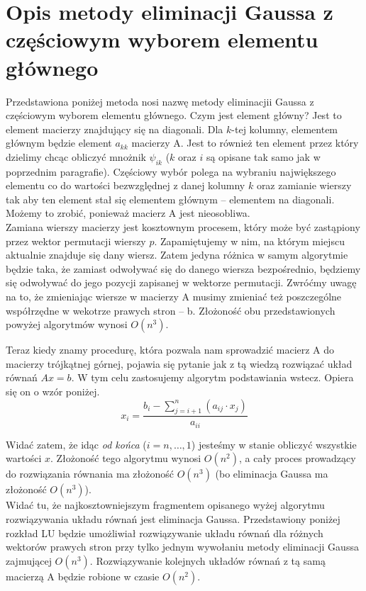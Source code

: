 \documentclass[]{article}
\begin{document}
	\section*{Opis metody eliminacji Gaussa z częściowym wyborem elementu głównego}
	Przedstawiona poniżej metoda nosi nazwę metody eliminacjii Gaussa z częściowym wyborem elementu głównego.
	Czym jest element główny? Jest to element macierzy znajdujący się na diagonali. Dla $k$-tej kolumny, elementem głównym będzie element $a_{kk}$ macierzy A. Jest to również ten element przez który dzielimy chcąc obliczyć mnożnik $\psi_{ik}$ ($k$ oraz $i$ są opisane tak samo jak w poprzednim paragrafie). Częściowy wybór polega na wybraniu największego elementu co do wartości bezwzględnej z danej kolumny $k$ oraz zamianie wierszy tak aby ten element stał się elementem głównym -- elementem na diagonali. Możemy to zrobić, ponieważ macierz A jest nieosobliwa. \\
	Zamiana wierszy macierzy jest kosztownym procesem, który może być zastąpiony przez wektor permutacji wierszy $p$. Zapamiętujemy w nim, na którym miejscu aktualnie znajduje się dany wiersz. Zatem jedyna różnica w samym algorytmie będzie taka, że zamiast odwoływać się do danego wiersza bezpośrednio, będziemy się odwoływać do jego pozycji zapisanej w wektorze permutacji. Zwróćmy uwagę na to, że zmieniając wiersze w macierzy A musimy zmieniać też poszczególne współrzędne w wekotrze prawych stron -- b. Złożoność obu przedstawionych powyżej algorytmów wynosi $O(n^3)$.
	
	Teraz kiedy znamy procedurę, która pozwala nam sprowadzić macierz A do macierzy trójkątnej górnej, pojawia się pytanie jak z tą wiedzą rozwiązać układ równań $Ax = b$. W tym celu zastosujemy algorytm podstawiania wstecz. Opiera się on o wzór poniżej.
	$$x_i = \frac{b_i - \sum_{j = i+1}^n (a_{ij} \cdot x_j)}{a_{ii}}$$
	
	Widać zatem, że idąc \textit{od końca} ($i=n,\ldots,1$) jesteśmy w stanie obliczyć wszystkie wartości $x$. Złożoność tego algorytmu wynosi $O(n^2)$, a cały proces prowadzący do rozwiązania równania ma złożoność $O(n^3)$ (bo eliminacja Gaussa ma złożoność $O(n^3)$). \\
	Widać tu, że najkosztowniejszym fragmentem opisanego wyżej algorytmu rozwiązywania układu równań jest eliminacja Gaussa. Przedstawiony poniżej rozkład LU będzie umożliwiał rozwiązywanie układu równań dla różnych wektorów prawych stron przy tylko jednym wywołaniu metody eliminacji Gaussa zajmującej $O(n^3)$. Rozwiązywanie kolejnych układów równań z tą samą macierzą A będzie robione w czasie $O(n^2)$.
	\clearpage
\end{document}
